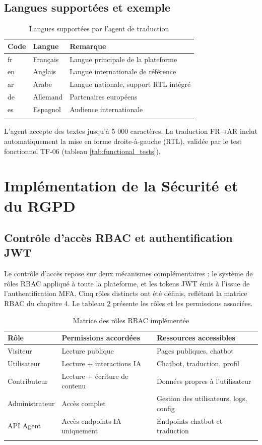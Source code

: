\subsection{Langues supportées et exemple}

\begin{longtable}{|m{2cm}|m{3.5cm}|m{7cm}|}
\hline
\textbf{Code} & \textbf{Langue} & \textbf{Remarque} \\
\hline
\endhead
\endfoot
\endlastfoot
\hline
fr & Français & Langue principale de la plateforme \\
\hline
en & Anglais & Langue internationale de référence \\
\hline
ar & Arabe & Langue nationale, support RTL intégré \\
\hline
de & Allemand & Partenaires européens \\
\hline
es & Espagnol & Audience internationale \\
\hline
\captionsetup{justification=centering,margin=2cm}
\caption{Langues supportées par l'agent de traduction}
\label{tab:languages}
\end{longtable}

L'agent accepte des textes jusqu'à 5 000 caractères. La traduction FR→AR inclut automatiquement la mise en forme droite-à-gauche (RTL), validée par le test fonctionnel TF-06 (tableau \ref{tab:functional_tests}).

\section{Implémentation de la Sécurité et du RGPD}

\subsection{Contrôle d'accès RBAC et authentification JWT}
Le contrôle d'accès repose sur deux mécanismes complémentaires : le système de rôles RBAC appliqué à toute la plateforme, et les tokens JWT émis à l'issue de l'authentification MFA. Cinq rôles distincts ont été définis, reflétant la matrice RBAC du chapitre 4. Le tableau \ref{tab:rbac_impl} présente les rôles et les permissions associées.

\begin{longtable}{|m{3cm}|m{4cm}|m{5.5cm}|}
\hline
\textbf{Rôle} & \textbf{Permissions accordées} & \textbf{Ressources accessibles} \\
\hline
\endhead
\endfoot
\endlastfoot
\hline
Visiteur & Lecture publique & Pages publiques, chatbot \\
\hline
Utilisateur & Lecture + interactions IA & Chatbot, traduction, profil \\
\hline
Contributeur & Lecture + écriture de contenu & Données propres à l'utilisateur \\
\hline
Administrateur & Accès complet & Gestion des utilisateurs, logs, config \\
\hline
API Agent & Accès endpoints IA uniquement & Endpoints chatbot et traduction \\
\hline
\captionsetup{justification=centering,margin=2cm}
\caption{Matrice des rôles RBAC implémentée}
\label{tab:rbac_impl}
\end{longtable}

